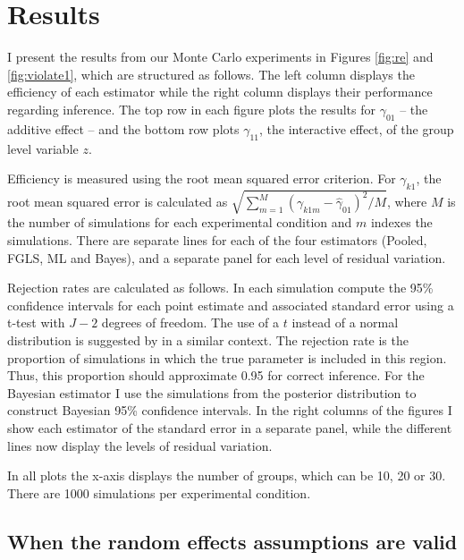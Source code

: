 \section{Results}

I present the results from our Monte Carlo experiments in Figures \ref{fig:re} and \ref{fig:violate1}, which are structured as follows. The left column displays the efficiency of each estimator while the right column displays their performance regarding inference. The top row in each figure plots the results for $\gamma_{01}$ -- the additive effect -- and the bottom row plots $\gamma_{11}$, the interactive effect, of the group level variable $z$.

Efficiency is measured using the root mean squared error criterion. For $\gamma_{k1}$, the root mean squared error is calculated as $\sqrt{\sum_{m=1}^{M} (\gamma_{k1m}-\hat\gamma_{01})^2/M}$, where $M$ is the number of simulations for each experimental condition and $m$ indexes the simulations. There are separate lines for each of the four estimators (Pooled, FGLS, ML and Bayes), and a separate panel for each level of residual variation.

Rejection rates are calculated as follows. In each simulation compute the 95\% confidence intervals for each point estimate and associated standard error using a t-test with $J-2$ degrees of freedom. The use of a $t$ instead of a  normal distribution is suggested by \citet{donald:2007} in a similar context. The rejection rate is the proportion of simulations in which the true parameter is included in this region. Thus, this proportion should approximate 0.95 for correct inference.  For the Bayesian estimator I use the simulations from the posterior distribution to construct Bayesian 95\% confidence intervals. In the right columns of the figures I show each estimator of the standard error in a separate panel, while the different lines now display the  levels of residual variation.

In all plots the x-axis displays  the number of groups, which can be 10, 20 or 30. There are 1000 simulations per experimental condition.




\subsection{When the random effects assumptions are valid}

